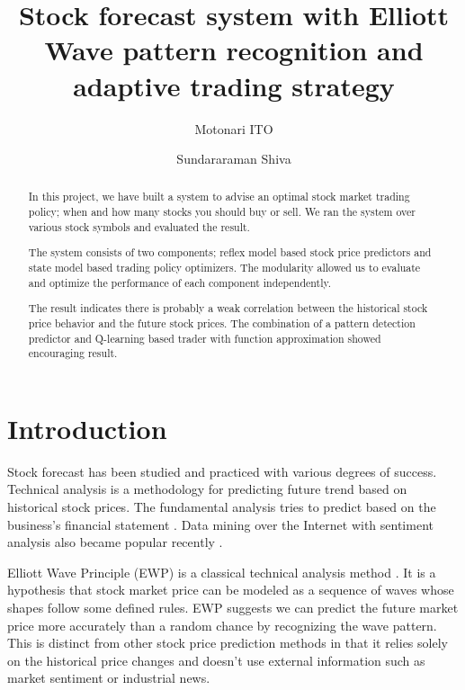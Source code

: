 \documentclass[twocolumn,10pt]{asme2ej}
\begin{document}
\title{Stock forecast system with Elliott Wave pattern recognition and adaptive trading strategy}
\author{Motonari ITO
}

\author{Sundararaman Shiva
}

\maketitle

\begin{abstract}
  In this project, we have built a system to advise an optimal stock market
  trading policy; when and how many stocks you should buy or sell. We ran the
  system over various stock symbols and evaluated the result.

  The system consists of two components; reflex model based stock price
  predictors and state model based trading policy optimizers. The
  modularity allowed us to evaluate and optimize the performance of each
  component independently.
  
  The result indicates there is probably a weak correlation between
  the historical stock price behavior and the future stock prices. The
  combination of a pattern detection predictor and Q-learning based
  trader with function approximation showed encouraging result.
\end{abstract}

\section{Introduction}

Stock forecast has been studied and practiced with various degrees of
success. Technical analysis is a methodology for predicting future
trend based on historical stock
prices\cite{wiki:technical_analysis}. The fundamental analysis tries
to predict based on the business's financial statement
\cite{wiki:fundamental_analysis}. Data mining over the Internet with
sentiment analysis also became popular recently
\cite{web:data_mining_analysis}.

Elliott Wave Principle (EWP) is a classical technical analysis method
\cite{frost1981elliott, web:study_of_cycles}. It is a hypothesis that
stock market price can be modeled as a sequence of waves whose shapes
follow some defined rules. EWP suggests we can predict the future
market price more accurately than a random chance by recognizing the
wave pattern.  This is distinct from other stock price prediction
methods in that it relies solely on the historical price changes and
doesn't use external information such as market sentiment or
industrial news.
\end{document}
